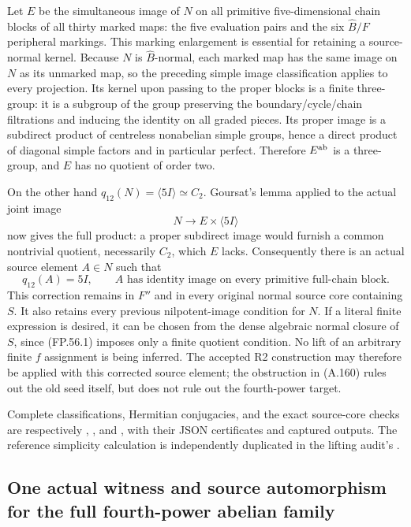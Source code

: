 Let $E$ be the simultaneous image of $N$ on all primitive
five-dimensional chain blocks of all thirty marked maps: the five
evaluation pairs and the six $\widehat B/F$ peripheral markings.
This marking enlargement is essential for retaining a source-normal
kernel. Because $N$ is $\widehat B$-normal, each marked map has
the same image on $N$ as its unmarked map, so the preceding simple
image classification applies to every projection.
Its kernel upon passing to the proper blocks is a finite three-group:
it is a subgroup of the group preserving the boundary/cycle/chain
filtrations and inducing the identity on all graded pieces.
Its proper image is a subdirect product of centreless nonabelian
simple groups, hence a direct product of diagonal simple factors
and in particular perfect. Therefore $E^{\rm ab}$ is a three-group,
and $E$ has no quotient of order two.

On the other hand $q_{12}(N)=\langle5I\rangle\simeq C_2$.
Goursat's lemma applied to the actual joint image
\[
                      N\longrightarrow E\times\langle5I\rangle
\]
now gives the full product: a proper subdirect image would furnish
a common nontrivial quotient, necessarily $C_2$, which $E$ lacks.
Consequently there is an actual source element $A\in N$ such that
\[
 q_{12}(A)=5I,\qquad
 A\text{ has identity image on every primitive full-chain block}.
 \tag{FP.56.1}
\]
This correction remains in $F''$ and in every original normal source
core containing $S$. It also retains every previous nilpotent-image
condition for $N$. If a literal finite expression is desired, it
can be chosen from the dense algebraic normal closure of $S$,
since (FP.56.1) imposes only a finite quotient condition.
No lift of an arbitrary finite $f$ assignment is being inferred.
The accepted R2 construction may therefore be applied with this
corrected source element; the obstruction in (A.160) rules out the
old seed itself, but does not rule out the fourth-power target.

Complete classifications, Hermitian conjugacies, and the exact
source-core checks are respectively
,
, and
, with their
JSON certificates and captured outputs. The reference simplicity
calculation is independently duplicated in the lifting audit's
.

\subsection{One actual witness and source automorphism for the full fourth-power abelian family}


